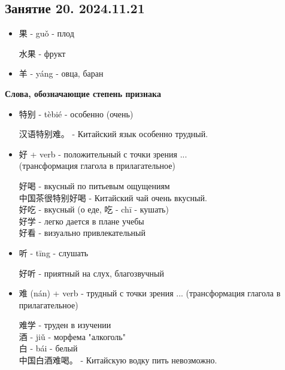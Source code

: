\LARGE
\newpage
\subsection{Занятие 20. 2024.11.21}
\begin{newgraphems}
	\begin{itemize}
		\item 果 - guǒ - плод
		\begin{example}
			水果 - фрукт
		\end{example}
		\item 羊 - yáng - овца, баран
	\end{itemize}
\end{newgraphems}
\textbf{Слова, обозначающие степень признака}
\begin{itemize}
	\item 特别 - tèbié - особенно (очень)
	\begin{example}\hfill\break
		汉语特别难。 - Китайский язык особенно трудный.
	\end{example}
	\item 好 + verb - положительный с точки зрения ...\\ (трансформация глагола в прилагательное)
	\begin{example}\hfill\break
		好喝 - вкусный по питьевым ощущениям\\
		中国茶很特别好喝 - Китайский чай очень вкусный.\\
		好吃 - вкусный (о еде, 吃 - chī - кушать)\\
		好学 - легко дается в плане учебы\\
		好看 - визуально привлекательный
	\end{example}
	\item 听 - tīng - слушать
	\begin{example}\hfill\break
		好听 - приятный на слух, благозвучный
	\end{example}
	\item 难 (nán) + verb - трудный с точки зрения ... (трансформация глагола в прилагательное)
	\begin{example}\hfill\break
		难学 - труден в изучении\\
		酒 - jiǔ - морфема "алкоголь"\\
		白 - bái - белый\\
		中国白酒难喝。 - Китайскую водку пить невозможно.
	\end{example}
\end{itemize}
